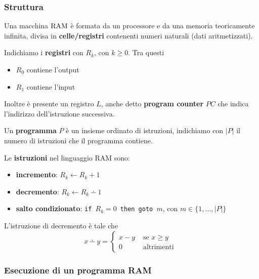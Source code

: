 \subsubsection{Struttura}

Una macchina $\text{RAM}$ è formata da un processore e da una memoria teoricamente infinita, divisa in \textbf{celle/registri} contenenti numeri naturali (dati aritmetizzati).

Indichiamo i \textbf{registri} con $R_k$, con $k \geq 0$. Tra questi 
\begin{itemize}
	\item $R_0$ contiene l'output
    
	\item $R_1$ contiene l'input
\end{itemize}

Inoltre è presente un registro $L$, anche detto \textbf{program counter} $PC$ che indica l'indirizzo dell'istruzione successiva. 

Un \textbf{programma} $P$ è un insieme ordinato di istruzioni, indichiamo con $|P|$ il numero di istruzioni che il programma contiene.

Le \textbf{istruzioni} nel linguaggio RAM sono: 
\begin{itemize}
	\item \textbf{incremento}: $R_k \leftarrow R_k + 1$
	
    \item \textbf{decremento}: $R_k \leftarrow R_k \dotminus 1$
	
    \item \textbf{salto condizionato}: \texttt{if $R_k = 0$ then goto $m$}, con $m \in \{1, \dots, |P|\}$
\end{itemize}
L'istruzione di decremento è tale che
$$ x \dotminus y = \begin{cases}
	x-y & \text{ se } x \geq y\\
	0 & \text{ altrimenti }
\end{cases}$$

\begin{center}
	
\end{center}

\subsubsection{Esecuzione di un programma RAM}

